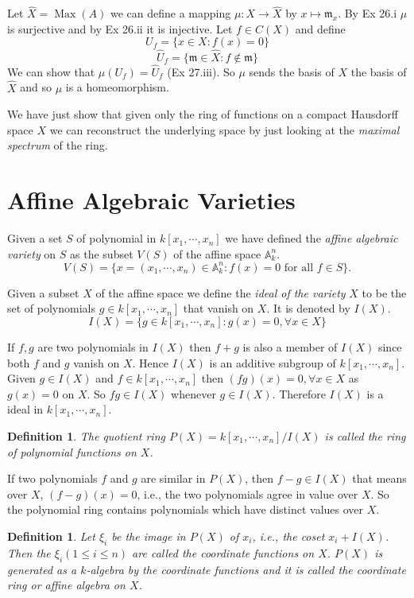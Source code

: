 \documentclass[]{report}
\newtheorem{defn}[theorem]{Definition}
\DeclareMathOperator\Max{Max}
\begin{document}
Let $\hat{X} = \Max(A)$ we can define a mapping $\mu: X\rightarrow \hat{X}$ by $x\mapsto \mathfrak{m}_x $. By Ex 26.i $\mu$ is surjective and by Ex 26.ii it is injective. Let $f\in C(X)$ and define
$$U_f = \{x\in X:f(x) = 0\}$$
$$\hat{U}_f = \{\mathfrak{m}\in \hat{X}:f\not\in \mathfrak{m}\}$$
We can show that $\mu(U_f) = \hat{U}_f$ (Ex 27.iii). So $\mu$ sends the basis of $X$ the basis of $\hat{X}$ and so $\mu$ is a homeomorphism.

We have just show that given only the ring of functions on a compact Hausdorff space $X$ we can reconstruct the underlying space by just looking at the \textit{maximal spectrum} of the ring.


\section{Affine Algebraic Varieties}

Given a set $S$ of polynomial in $k[x_1,\cdots,x_n]$ we have defined the \textit{affine algebraic variety} on $S$ as the subset $V(S)$ of the affine space $\mathbb{A}^n_k$.
$$V(S) = \{x = (x_1,\cdots,x_n) \in \mathbb{A}^n_k : f(x) = 0 \text{ for all } f \in S\}.$$

Given a subset $X$ of the affine space we define the \textit{ideal of the variety} $X$ to be the set of polynomials $g\in k[x_1,\cdots,x_n]$ that vanish on $X$. It is denoted by $I(X)$.
$$I(X) = \{g\in k[x_1,\cdots,x_n]: g(x) = 0, \forall x\in X\}$$

If $f,g$ are two polynomials in $I(X)$ then $f+g$ is also a member of $I(X)$ since both $f$ and $g$ vanish on $X$. Hence $I(X)$ is an additive subgroup of $k[x_1, \cdots, x_n]$. Given $g \in I(X)$ and $f \in k[x_1, \cdots, x_n]$ then $(fg)(x) = 0, \forall x \in X$ as $g(x) = 0$ on $X$. So $fg \in I(X)$ whenever $g \in I(X)$. Therefore $I(X)$ is a ideal in $k[x_1, \cdots, x_n]$.

\begin{defn} 
    The quotient ring
    $P(X) = k[x_1,\cdots,x_n]/I(X)$
    is called the ring of polynomial functions on $X$. 
\end{defn}

If two polynomials $f$ and $g$ are similar in $P(X)$, then $f-g \in I(X)$ that means over $X$, $(f-g)(x) = 0$, i.e., the two polynomials agree in value over $X$. So the polynomial ring contains polynomials which have distinct values over $X$.

\begin{defn}
    Let $\xi_i$ be the image in $P(X)$ of $x_i$, i.e., the coset $x_i + I(X)$. Then the $\xi_i (1\leq i\leq n)$ are called the \textit{coordinate functions} on $X$. $P(X)$ is generated as a $k$-algebra by the \textit{coordinate functions} and it is called the \textit{coordinate ring} or \textit{affine algebra} on $X$.
\end{defn}
\end{document}

